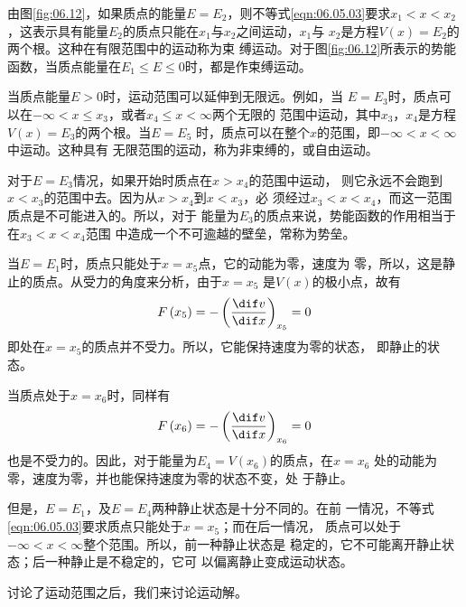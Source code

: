 \documentclass[../outline-of-mechanics.tex]{subfiles}
\begin{document}
由图\ref{fig:06.12}，如果质点的能量$ E=E_2 $，则不等式\eqref{eqn:06.05.03}要求$x _ 1
  < x < x _ 2$，这表示具有能量$ E_2 $的质点只能在$ x_1 $与$ x_2 $之间运动，$ x_1 $与
$ x_2 $是方程$ V \left(x\right) = E_2 $的两个根。这种在有限范围中的运动称为束
缚运动。对于图\ref{fig:06.12}所表示的势能函数，当质点能量在$ E_1 \leqslant E \leqslant 0 $时，都是作束缚运动。

当质点能量$ E > 0 $时，运动范围可以延伸到无限远。例如，当
$ E = E _ 3 $时，质点可以在$ -\infty < x \leqslant x_3 $，或者$ x_4 \leqslant x < \infty $两个无限的
范围中运动，其中$ x_3 $，$ x_4 $是方程$ V \left( x \right) = E _ { 3 } $的两个根。当$ E = E _ 5 $
时，质点可以在整个$ x $的范围，即$ - \infty < x < \infty $中运动。这种具有
无限范围的运动，称为非束缚的，或自由运动。

对于$ E = E _ 3 $情况，如果开始时质点在$ x > x _ { 4 } $的范围中运动，
则它永远不会跑到$ x < x_3 $的范围中去。因为从$ x > x _ { 4 } $到$ x < x _ 3 $，必
须经过$ x_3 < x < x_4 $，而这一范围质点是不可能进入的。所以，对于
能量为$ E_3 $的质点来说，势能函数的作用相当于在$ x _ { 3 } < x < x _ { 4 } $范围
中造成一个不可逾越的壁垒，常称为势垒。

当$ E = E _ 1 $时，质点只能处于$ x = x_5 $点，它的动能为零，速度为
零，所以，这是静止的质点。从受力的角度来分析，由于$ x = x_5 $
是$ V\left(x\right) $的极小点，故有
\begin{equation*}
  F \left( x _ { 5 } \right) = - \left( \frac { \dif v } { \dif x } \right) _ { x _ 5 } = 0
\end{equation*}
即处在$ x = x_5 $的质点并不受力。所以，它能保持速度为零的状态，
即静止的状态。

当质点处于$ x = x_6 $时，同样有
\begin{equation*}
  F \left( x _ { 6 } \right) = - \left( \frac { \dif v } { \dif x } \right) _ { x _ 6 } = 0
\end{equation*}
也是不受力的。因此，对于能量为$ E _ { 4 } = V \left( x _ { 6 } \right) $的质点，在$ x = x _ { 6 } $
处的动能为零，速度为零，并也能保持速度为零的状态不变，处
于静止。

但是，$ E = E _ { 1 } $，及$ E = E _ 4 $两种静止状态是十分不同的。在前
一情况，不等式\eqref{eqn:06.05.03}要求质点只能处于$ x = x _ { 5 } $；而在后一情况，
质点可以处于$ - \infty < x < \infty $整个范围。所以，前一种静止状态是
稳定的，它不可能离开静止状态；后一种静止是不稳定的，它可
以偏离静止变成运动状态。

讨论了运动范围之后，我们来讨论运动解。
\end{document}

